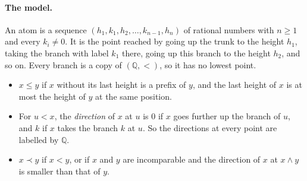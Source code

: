 \documentclass[12pt,a4paper,article]{memoir}
\newcommand{\Q}{\mathbb{Q}}
\newcommand{\emphdef}[1]{\emph{\textcolor{BrickRed}{#1}}}
\theoremstyle{definition}
\begin{document}
\paragraph{The model.}
An atom is a sequence $(h_1, k_1, h_2, \dots, k_{n-1}, h_n)$ of rational numbers with $n \ge 1$ and every $k_i \neq 0$.
It is the point reached by going up the trunk to the height $h_1$, taking the branch with label $k_1$ there,
going up this branch to the height $h_2$, and so on.
Every branch is a copy of $(\Q, <)$, so it has no lowest point.
\begin{itemize}
\item $x \le y$ if $x$ without its last height is a prefix of $y$,
and the last height of $x$ is at most the height of $y$ at the same position.
\item For $u < x$, the \emphdef{direction} of $x$ at $u$ is $0$ if $x$ goes further up the branch of $u$,
and $k$ if $x$ takes the branch $k$ at $u$.
So the directions at every point are labelled by $\Q$.
\item $x \prec y$ if $x < y$, or if $x$ and $y$ are incomparable
and the direction of $x$ at $x \wedge y$ is smaller than that of $y$.
\end{itemize}
\end{document}
